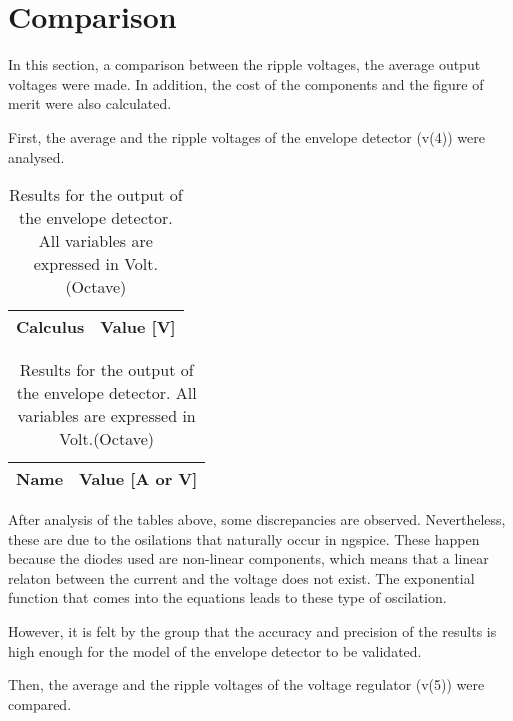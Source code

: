 \section{Comparison}\label{section:comparison}

In this section, a comparison between the ripple voltages, the average output voltages were made. In addition, the cost of the components and the figure of merit were also calculated.

First, the average and the ripple voltages of the envelope detector (v(4)) were analysed.

\begin{table}[ht]
\parbox{.45\linewidth}{
  \centering
  \begin{tabular}{|l|r|}
    \hline    
    {\bf Calculus} & {\bf Value [V]} \\ \hline
    
  \end{tabular}
  \caption{Results for the output of the envelope detector. All variables are expressed in Volt. (Ngspice)}} 
\parbox{.45\linewidth}{
  \centering
  \begin{tabular}{|l|r|}
    \hline    
    {\bf Name} & {\bf Value [A or V]} \\ \hline
    
  \end{tabular}
  \caption{Results for the output of the envelope detector. All variables are expressed in Volt.(Octave)}}
 
\end{table}

\par After analysis of the tables above, some discrepancies are observed. Nevertheless, these are due to the osilations that naturally occur in ngspice. These happen because the diodes used are non-linear components, which means that a linear relaton between the current and the voltage does not exist. The exponential function that comes into the equations leads to these type of oscilation. 

\par However, it is felt by the group that the accuracy and precision of the results is high enough for the model of the envelope detector to be validated. 



\par Then, the average and the ripple voltages of the voltage regulator (v(5)) were compared.


